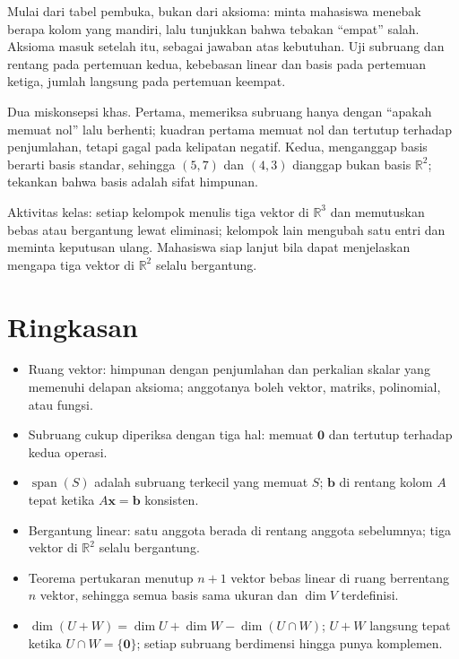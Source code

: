 \begin{untukdosen}
Mulai dari tabel pembuka, bukan dari aksioma: minta mahasiswa menebak berapa kolom yang
mandiri, lalu tunjukkan bahwa tebakan ``empat'' salah. Aksioma masuk setelah itu, sebagai
jawaban atas kebutuhan. Uji subruang dan rentang pada pertemuan kedua, kebebasan linear dan
basis pada pertemuan ketiga, jumlah langsung pada pertemuan keempat.

Dua miskonsepsi khas. Pertama, memeriksa subruang hanya dengan ``apakah memuat nol'' lalu
berhenti; kuadran pertama memuat nol dan tertutup terhadap penjumlahan, tetapi gagal pada
kelipatan negatif. Kedua, menganggap basis berarti basis standar, sehingga $(5,7)$ dan
$(4,3)$ dianggap bukan basis $\mathbb{R}^{2}$; tekankan bahwa basis adalah sifat himpunan.

Aktivitas kelas: setiap kelompok menulis tiga vektor di $\mathbb{R}^{3}$ dan memutuskan bebas
atau bergantung lewat eliminasi; kelompok lain mengubah satu entri dan meminta keputusan
ulang. Mahasiswa siap lanjut bila dapat menjelaskan mengapa tiga vektor di $\mathbb{R}^{2}$
selalu bergantung.
\end{untukdosen}

\section{Ringkasan}

\begin{ringkasan}
\begin{itemize}
  \item Ruang vektor: himpunan dengan penjumlahan dan perkalian skalar yang memenuhi delapan
        aksioma; anggotanya boleh vektor, matriks, polinomial, atau fungsi.
  \item Subruang cukup diperiksa dengan tiga hal: memuat $\mathbf{0}$ dan tertutup terhadap
        kedua operasi.
  \item $\operatorname{span}(S)$ adalah subruang terkecil yang memuat $S$; $\mathbf{b}$ di
        rentang kolom $A$ tepat ketika $A\mathbf{x}=\mathbf{b}$ konsisten.
  \item Bergantung linear: satu anggota berada di rentang anggota sebelumnya; tiga vektor di
        $\mathbb{R}^{2}$ selalu bergantung.
  \item Teorema pertukaran menutup $n+1$ vektor bebas linear di ruang berrentang $n$ vektor,
        sehingga semua basis sama ukuran dan $\dim V$ terdefinisi.
  \item $\dim(U+W)=\dim U+\dim W-\dim(U\cap W)$; $U+W$ langsung tepat ketika
        $U\cap W=\{\mathbf{0}\}$; setiap subruang berdimensi hingga punya komplemen.
\end{itemize}
\end{ringkasan}

